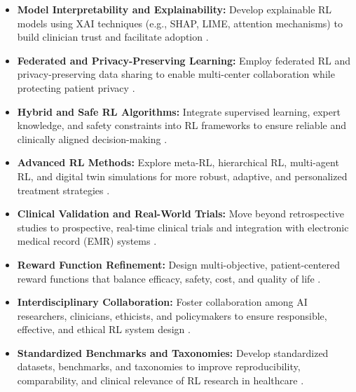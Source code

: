 \begin{itemize}
    \item \textbf{Model Interpretability and Explainability:} Develop explainable RL models using XAI techniques (e.g., SHAP, LIME, attention mechanisms) to build clinician trust and facilitate adoption \cite{banumathiReinforcementLearningPersonalized2025, maDeepAttentionQnetwork2023, gorrepatiReinforcementLearningFramework2025, frommeyerReinforcementLearningIts2025}.
    \item \textbf{Federated and Privacy-Preserving Learning:} Employ federated RL and privacy-preserving data sharing to enable multi-center collaboration while protecting patient privacy \cite{banumathiReinforcementLearningPersonalized2025, abdellatifReinforcementLearningIntelligent2021, banumathiReinforcementLearningPersonalized2025a}.
    \item \textbf{Hybrid and Safe RL Algorithms:} Integrate supervised learning, expert knowledge, and safety constraints into RL frameworks to ensure reliable and clinically aligned decision-making \cite{wuValuebasedDeepReinforcement2023, yuSupervisedactorcriticReinforcementLearning2020, zhaoSafeenhancedFullyClosedloop2025, gorrepatiReinforcementLearningFramework2025}.
    \item \textbf{Advanced RL Methods:} Explore meta-RL, hierarchical RL, multi-agent RL, and digital twin simulations for more robust, adaptive, and personalized treatment strategies \cite{banumathiReinforcementLearningPersonalized2025, decarloReinforcementLearningPKPD2024, gorrepatiReinforcementLearningFramework2025, petersenDeepReinforcementLearning2019}.
    \item \textbf{Clinical Validation and Real-World Trials:} Move beyond retrospective studies to prospective, real-time clinical trials and integration with electronic medical record (EMR) systems \cite{zhengPersonalizedMultimorbidityManagement2021, gorrepatiReinforcementLearningFramework2025, barataReinforcementLearningModel2023, ohEffectiveDatadrivenPrecision2022}.
    \item \textbf{Reward Function Refinement:} Design multi-objective, patient-centered reward functions that balance efficacy, safety, cost, and quality of life \cite{luoReinforcementLearningDynamic2024, petersenDeepReinforcementLearning2019, yangPrescDRLDeepReinforcement2024, zadehOptimizingWarfarinDosing2023}.
    \item \textbf{Interdisciplinary Collaboration:} Foster collaboration among AI researchers, clinicians, ethicists, and policymakers to ensure responsible, effective, and ethical RL system design \cite{banumathiReinforcementLearningPersonalized2025, banumathiReinforcementLearningPersonalized2025a, frommeyerReinforcementLearningIts2025}.
    \item \textbf{Standardized Benchmarks and Taxonomies:} Develop standardized datasets, benchmarks, and taxonomies to improve reproducibility, comparability, and clinical relevance of RL research in healthcare \cite{frommeyerReinforcementLearningIts2025, abdellatifReinforcementLearningIntelligent2021}.
\end{itemize}


